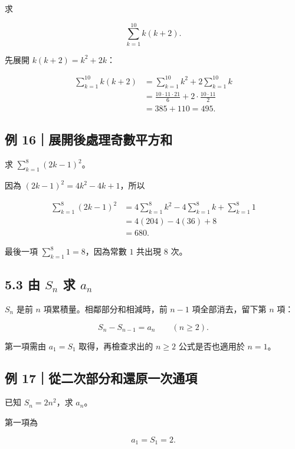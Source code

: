 \documentclass[11pt,a4paper]{article}
\begin{document}
求

\[
\sum_{k=1}^{10}k(k+2).
\]

先展開 \(k(k+2)=k^2+2k\)：

\[
\begin{aligned}
\sum_{k=1}^{10}k(k+2)
&=\sum_{k=1}^{10}k^2+2\sum_{k=1}^{10}k\\
&=\frac{10\cdot11\cdot21}{6}
+2\cdot\frac{10\cdot11}{2}\\
&=385+110=495.
\end{aligned}
\]

\subsection{例 16｜展開後處理奇數平方和}\label{ux4f8b-16ux5c55ux958bux5f8cux8655ux7406ux5947ux6578ux5e73ux65b9ux548c}

求 \(\displaystyle\sum_{k=1}^{8}(2k-1)^2\)。

因為 \((2k-1)^2=4k^2-4k+1\)，所以

\[
\begin{aligned}
\sum_{k=1}^{8}(2k-1)^2
&=4\sum_{k=1}^{8}k^2-4\sum_{k=1}^{8}k+\sum_{k=1}^{8}1\\
&=4(204)-4(36)+8\\
&=680.
\end{aligned}
\]

最後一項 \(\sum_{k=1}^{8}1=8\)，因為常數 \(1\) 共出現 8 次。

\subsection{\texorpdfstring{5.3 由 \(S_n\) 求 \(a_n\)}{5.3 由 S\_n 求 a\_n}}\label{ux7531-s_n-ux6c42-a_n}

\(S_n\) 是前 \(n\) 項累積量。相鄰部分和相減時，前 \(n-1\) 項全部消去，留下第 \(n\) 項：

\[
S_n-S_{n-1}=a_n\qquad(n\ge2).
\]

第一項需由 \(a_1=S_1\) 取得，再檢查求出的 \(n\ge2\) 公式是否也適用於 \(n=1\)。

\subsection{例 17｜從二次部分和還原一次通項}\label{ux4f8b-17ux5f9eux4e8cux6b21ux90e8ux5206ux548cux9084ux539fux4e00ux6b21ux901aux9805}

已知 \(S_n=2n^2\)，求 \(a_n\)。

第一項為

\[
a_1=S_1=2.
\]
\end{document}
